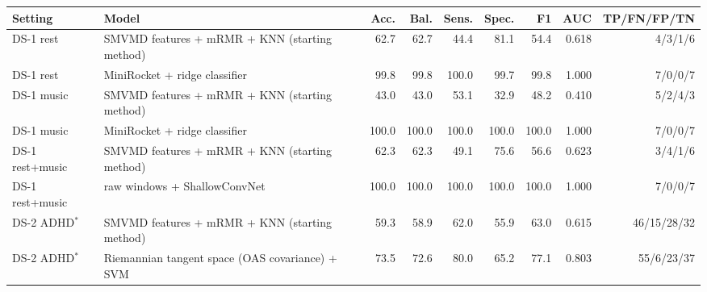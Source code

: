 \scriptsize
\begin{tabular}{lp{3.9cm}rrrrrrr}
\hline
Setting & Model & Acc. & Bal. & Sens. & Spec. & F1 & AUC & TP/FN/FP/TN \\
\hline
DS-1 rest & SMVMD features + mRMR + KNN (starting method) & 62.7 & 62.7 & 44.4 & 81.1 & 54.4 & 0.618 & 4/3/1/6 \\
DS-1 rest & MiniRocket + ridge classifier & 99.8 & 99.8 & 100.0 & 99.7 & 99.8 & 1.000 & 7/0/0/7 \\
DS-1 music & SMVMD features + mRMR + KNN (starting method) & 43.0 & 43.0 & 53.1 & 32.9 & 48.2 & 0.410 & 5/2/4/3 \\
DS-1 music & MiniRocket + ridge classifier & 100.0 & 100.0 & 100.0 & 100.0 & 100.0 & 1.000 & 7/0/0/7 \\
DS-1 rest+music & SMVMD features + mRMR + KNN (starting method) & 62.3 & 62.3 & 49.1 & 75.6 & 56.6 & 0.623 & 3/4/1/6 \\
DS-1 rest+music & raw windows + ShallowConvNet & 100.0 & 100.0 & 100.0 & 100.0 & 100.0 & 1.000 & 7/0/0/7 \\
DS-2 ADHD$^\ast$ & SMVMD features + mRMR + KNN (starting method) & 59.3 & 58.9 & 62.0 & 55.9 & 63.0 & 0.615 & 46/15/28/32 \\
DS-2 ADHD$^\ast$ & Riemannian tangent space (OAS covariance) + SVM & 73.5 & 72.6 & 80.0 & 65.2 & 77.1 & 0.803 & 55/6/23/37 \\
\hline
\end{tabular}
